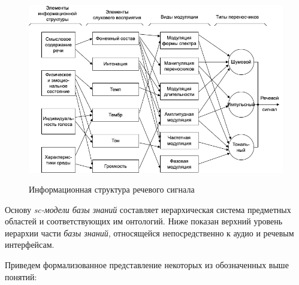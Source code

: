 \begin{figure}[H]
    \caption{Информационная структура речевого сигнала \cite{Lobanov2006}}
        \includegraphics[scale=0.8, width=1.0\textwidth]{author/part4/figures/ch43_fig03_speech-signal-inf-structure-ru.png}
    \label{fig:speech-signal-inf-structure-ru}
\end{figure}

Основу \textit{sc-модели базы знаний} составляет иерархическая система предметных областей и соответствующих им онтологий. Ниже показан верхний уровень иерархии части \textit{базы знаний}, относящейся непосредственно к аудио и речевым интерфейсам.

Приведем формализованное представление некоторых из обозначенных выше понятий:

